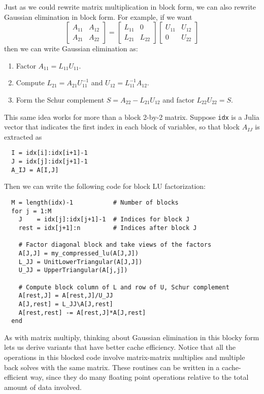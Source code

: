 \documentclass[12pt, leqno]{article}
\begin{document}
Just as we could rewrite matrix multiplication in block form, we can also
rewrite Gaussian elimination in block form.  For example, if we want
\[
  \begin{bmatrix} A_{11} & A_{12} \\ A_{21} & A_{22} \end{bmatrix} =
  \begin{bmatrix} L_{11} & 0 \\ L_{21} & L_{22} \end{bmatrix}
  \begin{bmatrix} U_{11} & U_{12} \\ 0 & U_{22} \end{bmatrix}
\]
then we can write Gaussian elimination as:
\begin{enumerate}
\item
  Factor $A_{11} = L_{11} U_{11}$.
\item
  Compute $L_{21} = A_{21} U_{11}^{-1}$ and $U_{12} = L_{11}^{-1} A_{12}$.
\item
  Form the Schur complement $S = A_{22} - L_{21} U_{12}$ and factor
  $L_{22} U_{22} = S$.
\end{enumerate}

This same idea works for more than a block 2-by-2 matrix.
Suppose {\tt idx} is a Julia vector that indicates the first index
in each block of variables, so that block $A_{IJ}$ is extracted as
\begin{lstlisting}
  I = idx[i]:idx[i+1]-1
  J = idx[j]:idx[j+1]-1
  A_IJ = A[I,J]
\end{lstlisting}
Then we can write the following code for block LU factorization:
\begin{lstlisting}
  M = length(idx)-1           # Number of blocks
  for j = 1:M
    J    = idx[j]:idx[j+1]-1  # Indices for block J
    rest = idx[j+1]:n         # Indices after block J

    # Factor diagonal block and take views of the factors
    A[J,J] = my_compressed_lu(A[J,J])
    L_JJ = UnitLowerTriangular(A[J,J])
    U_JJ = UpperTriangular(A[j,j])

    # Compute block column of L and row of U, Schur complement
    A[rest,J] = A[rest,J]/U_JJ
    A[J,rest] = L_JJ\A[J,rest]
    A[rest,rest] -= A[rest,J]*A[J,rest]
  end
\end{lstlisting}

As with matrix multiply, thinking about Gaussian elimination in this
blocky form lets us derive variants that have better cache efficiency.
Notice that all the operations in this blocked code involve matrix-matrix
multiplies and multiple back solves with the same matrix.  These routines
can be written in a cache-efficient way, since they do many floating point
operations relative to the total amount of data involved.
\end{document}
